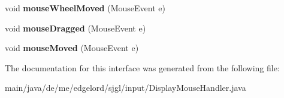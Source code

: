 \begin{DoxyCompactItemize}
void {\bfseries mouse\+Wheel\+Moved} (Mouse\+Event e)
\item 
\mbox{\label{interfacede_1_1me_1_1edgelord_1_1sjgl_1_1input_1_1_display_mouse_handler_a0fd0fb813f311120fa13cf619df67bf6}} 
void {\bfseries mouse\+Dragged} (Mouse\+Event e)
\item 
\mbox{\label{interfacede_1_1me_1_1edgelord_1_1sjgl_1_1input_1_1_display_mouse_handler_a10f3ee855a4155533b289fc7dc2c5d5b}} 
void {\bfseries mouse\+Moved} (Mouse\+Event e)
\end{DoxyCompactItemize}


The documentation for this interface was generated from the following file\+:\begin{DoxyCompactItemize}
\item 
main/java/de/me/edgelord/sjgl/input/Display\+Mouse\+Handler.\+java\end{DoxyCompactItemize}
